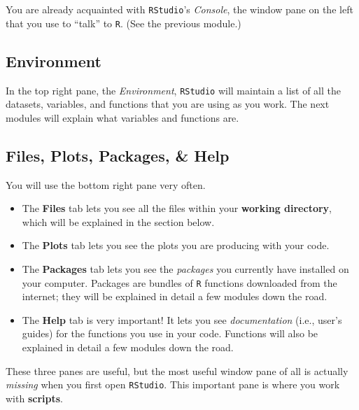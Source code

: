 \documentclass[]{book}
\providecommand{\tightlist}{%
  \setlength{\itemsep}{0pt}\setlength{\parskip}{0pt}}
\begin{document}
You are already acquainted with \texttt{RStudio}'s \emph{Console}, the window pane on the left that you use to ``talk'' to \texttt{R}. (See the previous module.)

\hypertarget{environment}{%
\subsection*{Environment}\label{environment}}

In the top right pane, the \emph{Environment}, \texttt{RStudio} will maintain a list of all the datasets, variables, and functions that you are using as you work. The next modules will explain what variables and functions are.

\hypertarget{files-plots-packages-help}{%
\subsection*{Files, Plots, Packages, \& Help}\label{files-plots-packages-help}}

You will use the bottom right pane very often.

\begin{itemize}
\tightlist
\item
  The \textbf{Files} tab lets you see all the files within your \textbf{working directory}, which will be explained in the section below.\\
\item
  The \textbf{Plots} tab lets you see the plots you are producing with your code.\\
\item
  The \textbf{Packages} tab lets you see the \emph{packages} you currently have installed on your computer. Packages are bundles of \texttt{R} functions downloaded from the internet; they will be explained in detail a few modules down the road.\\
\item
  The \textbf{Help} tab is very important! It lets you see \emph{documentation} (i.e., user's guides) for the functions you use in your code. Functions will also be explained in detail a few modules down the road.
\end{itemize}

These three panes are useful, but the most useful window pane of all is actually \emph{missing} when you first open \texttt{RStudio}. This important pane is where you work with \textbf{scripts}.
\end{document}
